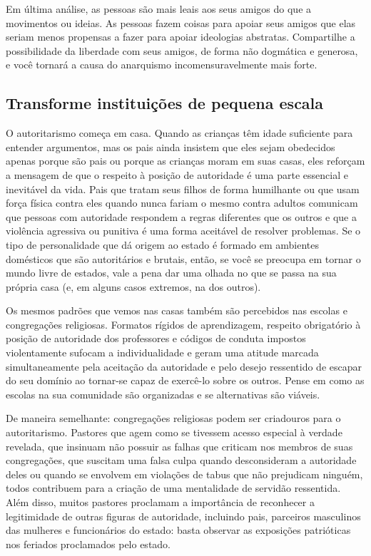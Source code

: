 Em última análise, as pessoas são mais leais aos seus amigos do que a movimentos ou ideias. As pessoas fazem coisas para apoiar seus amigos que elas seriam menos propensas a fazer para apoiar ideologias abstratas. Compartilhe a possibilidade da liberdade com seus amigos, de forma não dogmática e generosa, e você tornará a causa do anarquismo incomensuravelmente mais forte.

\subsection*{Transforme instituições de pequena escala}

O autoritarismo começa em casa. Quando as crianças têm idade suficiente para entender argumentos, mas os pais ainda insistem que eles sejam obedecidos apenas porque são pais ou porque as crianças moram em suas casas, eles reforçam a mensagem de que o respeito à posição de autoridade é uma parte essencial e inevitável da vida. Pais que tratam seus filhos de forma humilhante ou que usam força física contra eles quando nunca fariam o mesmo contra adultos comunicam que pessoas com autoridade respondem a regras diferentes que os outros e que a violência agressiva ou punitiva é uma forma aceitável de resolver problemas. Se o tipo de personalidade que dá origem ao estado é formado em ambientes domésticos que são autoritários e brutais, então, se você se preocupa em tornar o mundo livre de estados, vale a pena dar uma olhada no que se passa na sua própria casa (e, em alguns casos extremos, na dos outros).

Os mesmos padrões que vemos nas casas também são percebidos nas escolas e congregações religiosas. Formatos rígidos de aprendizagem, respeito obrigatório à posição de autoridade dos professores e códigos de conduta impostos violentamente sufocam a individualidade e geram uma atitude marcada simultaneamente pela aceitação da autoridade e pelo desejo ressentido de escapar do seu domínio ao tornar-se capaz de exercê-lo sobre os outros. Pense em como as escolas na sua comunidade são organizadas e se alternativas são viáveis.

De maneira semelhante: congregações religiosas podem ser criadouros para o autoritarismo. Pastores que agem como se tivessem acesso especial à verdade revelada, que insinuam não possuir as falhas que criticam nos membros de suas congregações, que suscitam uma falsa culpa quando desconsideram a autoridade deles ou quando se envolvem em violações de tabus que não prejudicam ninguém, todos contribuem para a criação de uma mentalidade de servidão ressentida. Além disso, muitos pastores proclamam a importância de reconhecer a legitimidade de outras figuras de autoridade, incluindo pais, parceiros masculinos das mulheres e funcionários do estado: basta observar as exposições patrióticas nos feriados proclamados pelo estado.

